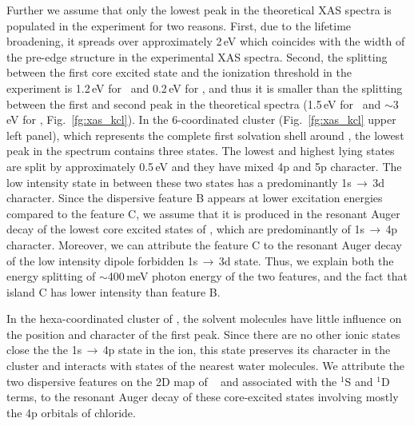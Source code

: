 Further we assume that only the lowest peak in the theoretical XAS spectra is populated in the experiment for two reasons. First, due to the lifetime broadening, it spreads over approximately 2\,eV which coincides with the width of the pre-edge structure in the experimental XAS spectra. Second, the splitting between the first core excited state and the ionization threshold in the experiment is 1.2\,eV for \ki~and 0.2\,eV for \cli, and thus it is smaller than the splitting between the first and second peak in the theoretical spectra (1.5\,eV for \ki~and $\sim$3\,eV for \cli, Fig.\ \ref{fg:xas_kcl}). In the 6-coordinated cluster (Fig.\ \ref{fg:xas_kcl} upper left panel), which represents the complete first solvation shell around \ki, the lowest peak in the spectrum contains three states. The lowest and highest lying states are split by approximately 0.5\,eV and they have mixed 4p and 5p character. The low intensity state in between these two states has a predominantly 1s$\,\rightarrow\,$3d character. Since the dispersive feature B appears at lower excitation energies compared to the feature C, we assume that it is produced in the resonant Auger decay of the lowest core excited states of \ki, which are predominantly of 1s$\,\rightarrow\,$4p character. Moreover, we can attribute the feature C to the resonant Auger decay of the low intensity dipole forbidden 1s$\,\rightarrow\,$3d state. Thus, we explain both the energy splitting of $\sim$400\,meV photon energy of the two features, and the fact that island C has lower intensity than feature B.


In the hexa-coordinated cluster of \cli, the solvent molecules have little influence on the position and character of the first peak. Since there are no other ionic states close the the 1s$\,\rightarrow\,$4p state in the ion, this state preserves its character in the cluster and interacts with states of the nearest water molecules. We attribute the two dispersive features on the 2D map of \cli~ and associated with the $^{1}$S and $^{1}$D terms, to the resonant Auger decay of these core-excited states involving mostly the 4p orbitals of chloride. 


